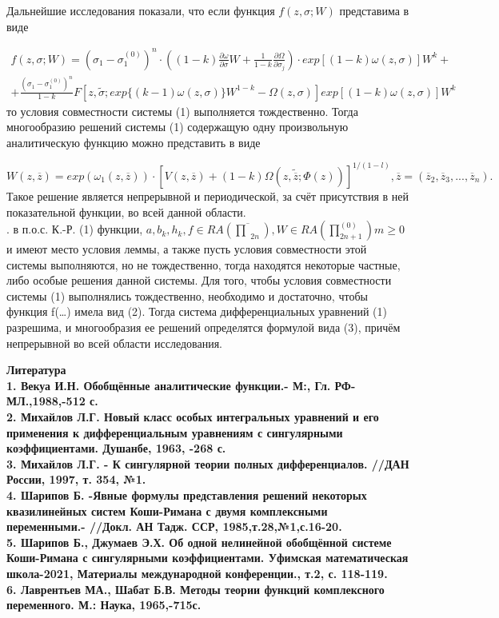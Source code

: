 \documentclass[11pt, a4paper]{article}
\begin{document}
	\rm Дальнейшие исследования показали, что если функция $f(z, \sigma; W)$  представима в виде

	\begin{align} \tag{2}
		f(z, \sigma; W) = (\sigma_1 - \sigma_1 ^{(0)})^n \cdot \left((1-k)\frac{\partial\omega}{\partial\sigma}W + \frac{1}{1-k} \frac{\partial\Omega}{\partial\sigma_j} \right) \cdot exp[(1-k)\omega(z, \sigma)]W^k +\nonumber \\
		+ \frac{(\sigma_1 - \sigma_1 ^{(0)}) ^n}{1-k}F\left[z,\tilde{\sigma};exp\{(k-1)\omega(z, \sigma)\}W^{1-k} - \Omega(z, \sigma)\right]exp[(1-k)\omega(z, \sigma)]W^k \nonumber
	\end{align}
	то условия совместности системы (1) выполняется тождественно. Тогда многообразию решений системы (1) содержащую одну произвольную аналитическую функцию можно представить в виде
	
	\begin{equation} \tag{3}
		W(z, \overline{z}) = exp\left(\omega_1(z, \overline{z})\right) \cdot \left[V(z, \overline{z}) + (1-k)\Omega(z, \tilde{\overline{z}};\Phi(z))\right]^{1/(1-l)}, \overline{z}=(\overline{z}_2, \overline{z}_3,..., \overline{z}_n).
	\end{equation}
	Такое решение является непрерывной и периодической, за счёт присутствия в ней показательной функции, во всей данной области. \\
	
	.  в п.о.с. К.-Р. (1) функции, $a, b_k, h_k, f \in RA(\overline{\prod}_{2n}), W \in RA(\prod_{2n+1}^{(0)}) m \geq 0$ и имеют место условия леммы,  а также пусть условия совместности этой системы выполняются, но не тождественно, тогда находятся некоторые частные, либо особые решения  данной системы. Для того, чтобы условия совместности системы (1) выполнялись тождественно, необходимо и достаточно, чтобы функция f(…) имела вид (2). Тогда система дифференциальных уравнений (1) разрешима, и многообразия ее решений определятся формулой вида (3), причём непрерывной во всей области исследования. 
	
	\bf Литература\\
	\bf1. \rm Векуа И.Н. Обобщённые аналитические функции.- М:, Гл. РФ-МЛ.,1988,-512 с. \\
	\bf2. \rm Михайлов Л.Г. Новый класс особых интегральных уравнений и его применения к дифференциальным уравнениям с сингулярными коэффициентами. Душанбе, 1963, -268 с.\\
	\bf3. \rm Михайлов Л.Г. - К сингулярной теории полных дифференциалов. //ДАН России, 1997, т. 354, №1.\\
	\bf4. \rm Шарипов Б. -Явные формулы представления решений некоторых квазилинейных систем Коши-Римана с двумя комплексными переменными.- //Докл. АН Тадж. ССР, 1985,т.28,№1,с.16-20.\\
	\bf5. \rm Шарипов Б., Джумаев Э.Х. Об одной нелинейной обобщённой системе Коши-Римана с сингулярными коэффициентами. Уфимская математическая школа-2021, Материалы международной конференции., т.2, с. 118-119.\\
	\bf6. \rm Лаврентьев МА., Шабат Б.В. Методы теории функций комплексного переменного. М.: Наука, 1965,-715с.
	
	
\end{document}
